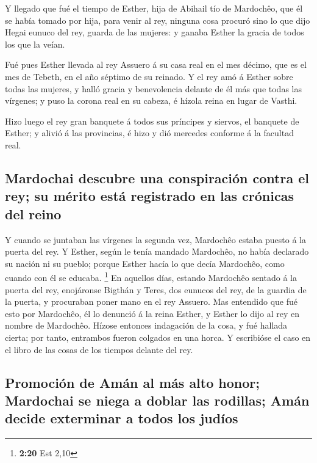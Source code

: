  Y llegado que fué el tiempo de Esther, hija de Abihail tío
de Mardochêo, que él se había tomado por hija, para venir al rey,
ninguna cosa procuró sino lo que dijo Hegai eunuco del rey, guarda de
las mujeres: y ganaba Esther la gracia de todos los que la veían.

 Fué pues Esther llevada al rey Assuero á su casa real en
el mes décimo, que es el mes de Tebeth, en el año séptimo de su reinado.
 Y el rey amó á Esther sobre todas las mujeres, y halló
gracia y benevolencia delante de él más que todas las vírgenes; y puso
la corona real en su cabeza, é hízola reina en lugar de Vasthi.

 Hizo luego el rey gran banquete á todos sus príncipes y
siervos, el banquete de Esther; y alivió á las provincias, é hizo y dió
mercedes conforme á la facultad real.

\hypertarget{mardochai-descubre-una-conspiraciuxf3n-contra-el-rey-su-muxe9rito-estuxe1-registrado-en-las-cruxf3nicas-del-reino}{%
\subsection{Mardochai descubre una conspiración contra el rey; su mérito
está registrado en las crónicas del
reino}\label{mardochai-descubre-una-conspiraciuxf3n-contra-el-rey-su-muxe9rito-estuxe1-registrado-en-las-cruxf3nicas-del-reino}}

 Y cuando se juntaban las vírgenes la segunda vez,
Mardochêo estaba puesto á la puerta del rey.  Y Esther,
según le tenía mandado Mardochêo, no había declarado su nación ni su
pueblo; porque Esther hacía lo que decía Mardochêo, como cuando con él
se educaba. \footnote{\textbf{2:20} Est 2,10}  En aquellos
días, estando Mardochêo sentado á la puerta del rey, enojáronse Bigthán
y Teres, dos eunucos del rey, de la guardia de la puerta, y procuraban
poner mano en el rey Assuero.  Mas entendido que fué esto
por Mardochêo, él lo denunció á la reina Esther, y Esther lo dijo al rey
en nombre de Mardochêo.  Hízose entonces indagación de la
cosa, y fué hallada cierta; por tanto, entrambos fueron colgados en una
horca. Y escribióse el caso en el libro de las cosas de los tiempos
delante del rey.

\hypertarget{promociuxf3n-de-amuxe1n-al-muxe1s-alto-honor-mardochai-se-niega-a-doblar-las-rodillas-amuxe1n-decide-exterminar-a-todos-los-juduxedos}{%
\subsection{Promoción de Amán al más alto honor; Mardochai se niega a
doblar las rodillas; Amán decide exterminar a todos los
judíos}\label{promociuxf3n-de-amuxe1n-al-muxe1s-alto-honor-mardochai-se-niega-a-doblar-las-rodillas-amuxe1n-decide-exterminar-a-todos-los-juduxedos}}

